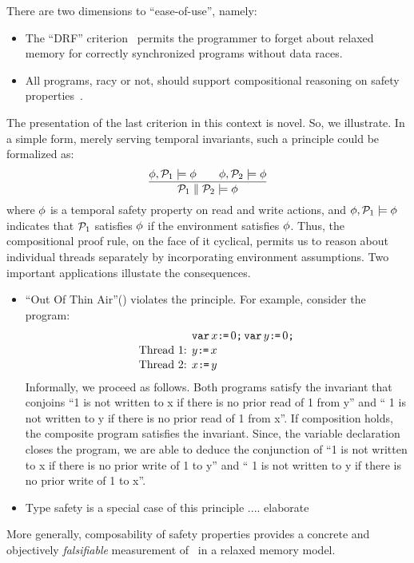 There are two dimensions to ``ease-of-use'', namely:
\begin{itemize}
\item The ``DRF'' criterion~\cite{DBLP:journals/tpds/AdveH93, DBLP:conf/isca/AdveH90} permits the programmer to forget about relaxed memory for correctly synchronized programs without data races.  

\item All programs, racy or not,  should support compositional reasoning on safety properties~\cite{PnueliSafety,Misra:1981:PNP:1313338.1313770,StarkSafety,Abadi:1993:CS:151646.151649}.  
\end{itemize}
The presentation of the last criterion in this context is novel.  So, we illustrate.  In a simple form, merely serving temporal invariants, such a principle could be formalized as:
\[
  \frac{
      \phi, \mathcal{P}_1 \models\phi
      \qquad
      \phi, \mathcal{P}_2 \models\phi
    }{\mathcal{P}_1 \parallel \mathcal{P}_2 \models \phi}
\]
where $\phi$ is a temporal safety property on read and write actions, and $\phi, \mathcal{P}_1 \models\phi$ indicates that $\mathcal{P}_1$ satisfies $\phi$ if the environment satisfies $\phi$.  Thus, the compositional proof rule, on the face of it cyclical, permits us to reason about individual threads separately by incorporating environment assumptions.   Two important applications illustate the consequences. 
\begin{itemize}
\item ``Out Of Thin Air''(\oota)  violates the principle.  For example, consider the program:
\begin{align*}
& \texttt{var}\, x\texttt{:}\mkern-1mu\texttt{=}\,0\texttt{;}\, \texttt{var}\, y\texttt{:}\mkern-1mu\texttt{=}\,0\texttt{;}\,  \\[-.5ex]
\mbox{Thread 1: } & y\texttt{:}\mkern-1mu\texttt{=}\, x \\[-.5ex]
\mbox{Thread 2: } & x \texttt{:}\mkern-1mu\texttt{=}\, y
\end{align*}
Informally, we proceed as follows.   Both programs satisfy the invariant that conjoins ``1 is not written to x  if there is no prior read  of 1 from y'' and `` 1 is not written to y  if there is no prior read  of 1 from x''.  If composition holds, the composite program satisfies the invariant.  Since, the variable declaration closes the program, we are able to deduce the conjunction of  ``1 is not written to x  if there is no prior write of 1 to y'' and `` 1 is not written to y  if there is no prior write  of 1 to x''. 

\item   Type safety is a special case of this principle .... elaborate
\end{itemize}
More generally, composability of safety properties provides a concrete and objectively {\em falsifiable} measurement of \oota\ in a relaxed memory model.

